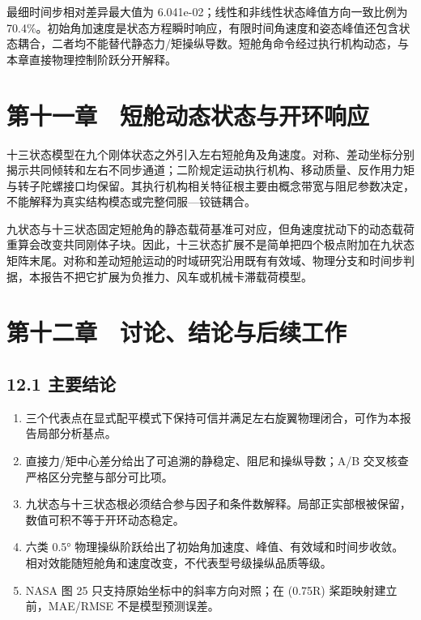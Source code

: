 \documentclass[UTF8,11pt,oneside,openany,fontset=windows]{ctexbook}
\begin{document}
最细时间步相对差异最大值为 6.041e-02；线性和非线性状态峰值方向一致比例为
70.4\%。初始角加速度是状态方程瞬时响应，有限时间角速度和姿态峰值还包含状态耦合，二者均不能替代静态力/矩操纵导数。短舱角命令经过执行机构动态，与本章直接物理控制阶跃分开解释。

\chapter{第十一章　短舱动态状态与开环响应}\label{ux7b2cux5341ux4e00ux7ae0-ux77edux8231ux52a8ux6001ux72b6ux6001ux4e0eux5f00ux73afux54cdux5e94}

十三状态模型在九个刚体状态之外引入左右短舱角及角速度。对称、差动坐标分别揭示共同倾转和左右不同步通道；二阶规定运动执行机构、移动质量、反作用力矩与转子陀螺接口均保留。其执行机构相关特征根主要由概念带宽与阻尼参数决定，不能解释为真实结构模态或完整伺服---铰链耦合。

九状态与十三状态固定短舱角的静态载荷基准可对应，但角速度扰动下的动态载荷重算会改变共同刚体子块。因此，十三状态扩展不是简单把四个极点附加在九状态矩阵末尾。对称和差动短舱运动的时域研究沿用既有有效域、物理分支和时间步判据，本报告不把它扩展为负推力、风车或机械卡滞载荷模型。

\chapter{第十二章　讨论、结论与后续工作}\label{ux7b2cux5341ux4e8cux7ae0-ux8ba8ux8bbaux7ed3ux8bbaux4e0eux540eux7eedux5de5ux4f5c}

\section{12.1 主要结论}\label{ux4e3bux8981ux7ed3ux8bba}

\begin{enumerate}
\def\labelenumi{\arabic{enumi}.}

\item
  三个代表点在显式配平模式下保持可信并满足左右旋翼物理闭合，可作为本报告局部分析基点。
\item
  直接力/矩中心差分给出了可追溯的静稳定、阻尼和操纵导数；A/B
  交叉核查严格区分完整与部分可比项。
\item
  九状态与十三状态根必须结合参与因子和条件数解释。局部正实部根被保留，数值可积不等于开环动态稳定。
\item
  六类 0.5°
  物理操纵阶跃给出了初始角加速度、峰值、有效域和时间步收敛。相对效能随短舱角和速度改变，不代表型号级操纵品质等级。
\item
  NASA 图 25 只支持原始坐标中的斜率方向对照；在 (0.75R)
  桨距映射建立前，MAE/RMSE 不是模型预测误差。
\end{enumerate}
\end{document}
